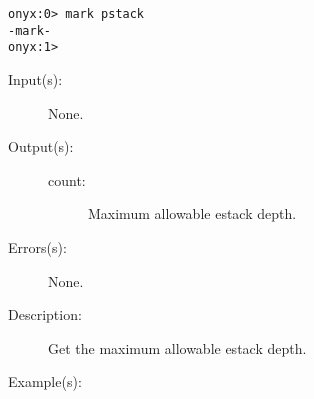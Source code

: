 \begin{description}
\begin{description}
\begin{verbatim}
onyx:0> mark pstack
-mark-
onyx:1>
		\end{verbatim}
	\end{description}
\label{systemdict:maxestack}
\item[{\onyxop{--}{maxestack}{count}}: ]
	\begin{description}\item[]
	\item[Input(s): ] None.
	\item[Output(s): ]
		\begin{description}\item[]
		\item[count: ]
			Maximum allowable estack depth.
		\end{description}
	\item[Errors(s): ] None.
	\item[Description: ]
		Get the maximum allowable estack depth.
	\item[Example(s): ]\begin{verbatim}


\end{verbatim}
\end{description}
\end{description}
